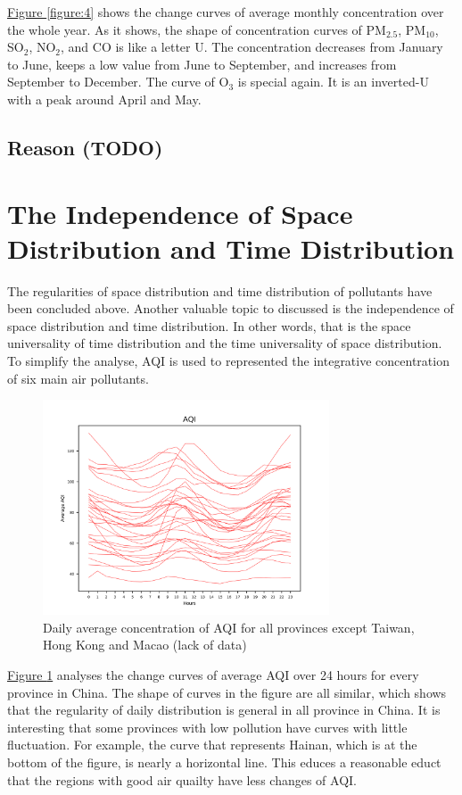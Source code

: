 \documentclass[letterpaper]{article}
\begin{document}
\hyperref[figure:4]{Figure \ref*{figure:4}} shows the change curves of average monthly concentration over the whole year. As it shows, the shape of concentration curves of PM$_{2.5}$, PM$_{10}$, SO$_{2}$, NO$_{2}$, and CO is like a letter U. The concentration decreases from January to June, keeps a low value from June to September, and increases from September to December. The curve of O$_{3}$ is special again. It is an inverted-U with a peak around April and May.

\subsection{Reason (TODO)}

\section{The Independence of Space Distribution and Time Distribution}

The regularities of space distribution and time distribution of pollutants have been concluded above. Another valuable topic to discussed is the independence of space distribution and time distribution. In other words, that is the space universality of time distribution and the time universality of space distribution. To simplify the analyse, AQI is used to represented the integrative concentration of six main air pollutants.

\begin{figure}[h]
  \includegraphics[width = 8.5cm]{dailyavg_pro_pltn.png}
  \caption{Daily average concentration of AQI for all provinces except Taiwan, Hong Kong and Macao (lack of data)} 
  \label{figure:5}
\end{figure}

\hyperref[figure:5]{Figure \ref*{figure:5}} analyses the change curves of average AQI over 24 hours for every province in China. The shape of curves in the figure are all similar, which shows that the regularity of daily distribution is general in all province in China. It is interesting that some provinces with low pollution have curves with little fluctuation. For example, the curve that represents Hainan, which is at the bottom of the figure, is nearly a horizontal line. This educes a reasonable educt that the regions with good air quailty have less changes of AQI.
\end{document}
